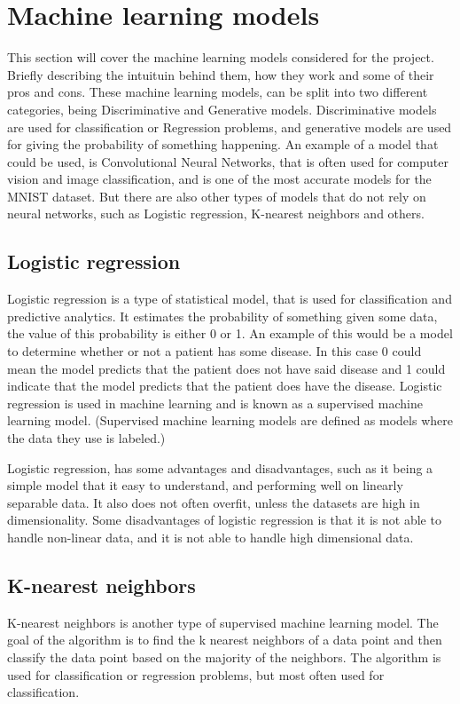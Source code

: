 \section{Machine learning models}\label{sec:machine-learning-models}
This section will cover the machine learning models considered for the project. Briefly describing the intuituin behind them, how they work and some of their pros and cons. These machine learning models, can be split into two different categories, being Discriminative and Generative models. Discriminative models are used for classification or Regression problems, and generative models are used for giving the probability of something happening. An example of a model that could be used, is Convolutional Neural Networks, that is often used for computer vision and image classification, and is one of the most accurate models for the MNIST dataset\cite{MnistStatictics}. But there are also other types of models that do not rely on neural networks, such as Logistic regression, K-nearest neighbors and others.

\subsection{Logistic regression}
Logistic regression is a type of statistical model, that is used for classification and predictive analytics. It estimates the probability of something given some data, the value of this probability is either 0 or 1\cite{WhatIsLogisticRegression}. An example of this would be a model to determine whether or not a patient has some disease. In this case 0 could mean the model predicts that the patient does not have said disease and 1 could indicate that the model predicts that the patient does have the disease. Logistic regression is used in machine learning and is known as a supervised machine learning model. (Supervised machine learning models are defined as models where the data they use is labeled\cite{SupervisedLearning}.)

Logistic regression, has some advantages and disadvantages, such as it being a simple model that it easy to understand, and performing well on linearly separable data\cite{LogisticRegressionProsAndCons}. It also does not often overfit, unless the datasets are high in dimensionality. Some disadvantages of logistic regression is that it is not able to handle non-linear data, and it is not able to handle high dimensional data. 

\subsection{K-nearest neighbors}
K-nearest neighbors is another type of supervised machine learning model\cite{K-NearestNeighborsIBM}. The goal of the algorithm is to find the k nearest neighbors of a data point and then classify the data point based on the majority of the neighbors. The algorithm is used for classification or regression problems, but most often used for classification.


